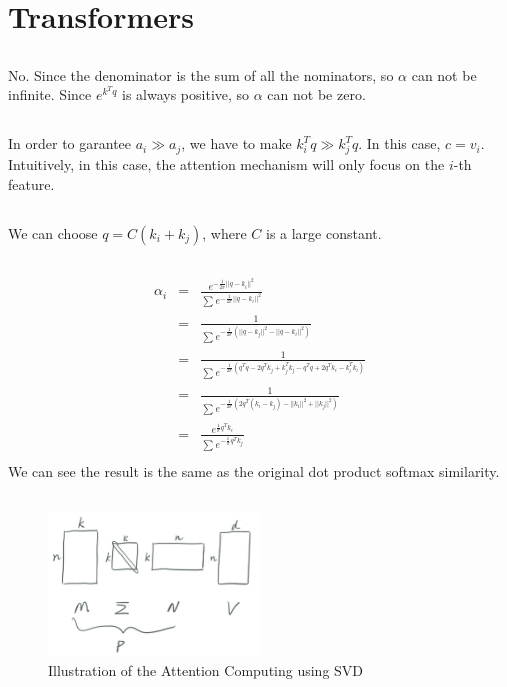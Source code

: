 \documentclass[12pt]{article}
\begin{document}
\section{Transformers}
\subsection{}
No. Since the denominator is the sum of all the nominators, so $\alpha$ can not be infinite. Since $e^{k^T q}$ is always positive, so $\alpha$ can not be zero. 

\subsection{}
In order to garantee $a_i \gg a_j$, we have to make $k_i^T q \gg k_j^T q$. In this case, $c = v_i$. Intuitively, in this case, the attention mechanism will only focus on the $i$-th feature.

\subsection{}
We can choose $q = C(k_i + k_j)$, where $C$ is a large constant.

\subsection{}
\begin{eqnarray}
\alpha_i &=& \frac{e^{-\frac{1}{2\sigma}||q - k_i||^2}}{\sum_{}^{}e^{-\frac{1}{2\sigma}||q - k_i||^2}} \nonumber \\
&=& \frac{1}{\sum_{}^{}e^{-\frac{1}{2\sigma}(||q-k_j||^2 - ||q-k_i||^2)}} \nonumber \\
&=& \frac{1}{\sum_{}^{}e^{-\frac{1}{2\sigma}(q^Tq - 2q^Tk_j + k_j^Tk_j - q^Tq + 2q^Tk_i - k_i^Tk_i)}} \nonumber \\
&=& \frac{1}{\sum_{}^{}e^{-\frac{1}{2\sigma}(2q^T(k_i - k_j) - ||k_i||^2 + ||k_j||^2)}} \nonumber \\
&=& \frac{e^{\frac{1}{\sigma}q^T k_i}}{\sum_{}^{}e^{-\frac{1}{\sigma}q^T k_j}} \nonumber \\
\end{eqnarray}
We can see the result is the same as the original dot product softmax similarity.

\subsection{}
\begin{figure}[h]
    \centering
    \includegraphics[width=0.5\textwidth]{imgs/5-5.png}
    \caption{Illustration of the Attention Computing using SVD}
    \label{fig:5-5}
\end{figure}
\end{document}
